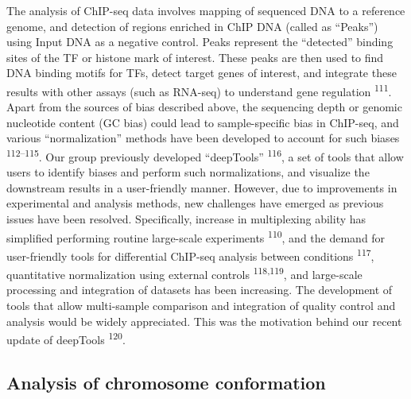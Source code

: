 \documentclass[11pt,twoside]{MPIthesis}
\theoremstyle{definition}
\theoremstyle{definition}
\theoremstyle{definition}
\theoremstyle{remark}
\begin{document}
The analysis of ChIP-seq data involves mapping of sequenced DNA to a
reference genome, and detection of regions enriched in ChIP DNA (called
as ``Peaks'') using Input DNA as a negative control. Peaks represent the
``detected'' binding sites of the TF or histone mark of interest. These
peaks are then used to find DNA binding motifs for TFs, detect target
genes of interest, and integrate these results with other assays (such
as RNA-seq) to understand gene regulation \textsuperscript{111}. Apart
from the sources of bias described above, the sequencing depth or
genomic nucleotide content (GC bias) could lead to sample-specific bias
in ChIP-seq, and various ``normalization'' methods have been developed
to account for such biases \textsuperscript{112--115}. Our group
previously developed ``deepTools'' \textsuperscript{116}, a set of tools
that allow users to identify biases and perform such normalizations, and
visualize the downstream results in a user-friendly manner. However, due
to improvements in experimental and analysis methods, new challenges
have emerged as previous issues have been resolved. Specifically,
increase in multiplexing ability has simplified performing routine
large-scale experiments \textsuperscript{110}, and the demand for
user-friendly tools for differential ChIP-seq analysis between
conditions \textsuperscript{117}, quantitative normalization using
external controls \textsuperscript{118,119}, and large-scale processing
and integration of datasets has been increasing. The development of
tools that allow multi-sample comparison and integration of quality
control and analysis would be widely appreciated. This was the
motivation behind our recent update of deepTools \textsuperscript{120}.

\subsection{Analysis of chromosome
conformation}\label{analysis-of-chromosome-conformation}
\end{document}
